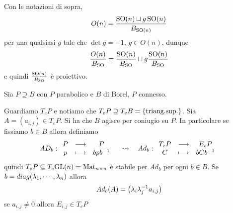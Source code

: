 \begin{remark}
Con le notazioni di sopra,
\[O(n)=\frac{\operatorname{SO}(n)\sqcup g\operatorname{SO}(n)}{B_{\operatorname{SO}(n)}}\]
per una qualsiasi $g$ tale che $\det g=-1$, $g\in O(n)$, dunque
\[\frac{O(n)}{B_{\operatorname{SO}}}=\frac{\operatorname{SO}(n)}{B_{\operatorname{SO}}}\sqcup g\frac{\operatorname{SO}(n)}{B_{\operatorname{SO}}}\]
e quindi $\frac{\operatorname{SO}(n)}{B_{\operatorname{SO}}}$ \`e proiettivo.
\end{remark}


\begin{example}[Parabolici di $\GL(n)$]
Sia $P\supseteq B$ con $P$ parabolico e $B$ di Borel, $P$ connesso.

Guardiamo $T_e P$ e notiamo che $T_e P\supseteq T_e B=\left\{{\text{triang.sup.}}\right\}$. Sia $A=(a_{i,j})\in T_e P$. Si ha che $B$ agisce per coniugio su $P$. In particolare se fissiamo $b\in B$ allora definiamo
\[AD_b:\begin{array}{ccc} {P} & \longrightarrow & {P}\\ {p} & \longmapsto & {bpb^{-1}} \end{array}\quad\leadsto\quad Ad_b:\begin{array}{ccc} {T_eP} & \longrightarrow & {E_eP}\\ {C} & \longmapsto & {bCb^{-1}} \end{array}\]
quindi $T_e P\subseteq T_e\mathrm{GL}(n)=\operatorname{Mat}_{n\times n}$ \`e stabile per $Ad_b$ per ogni $b\in B$. Se $b=diag(\lambda_1,\cdots,\lambda_n)$ allora
\[Ad_b(A)=\left({\lambda_i\lambda_j^{-1} a_{i,j}}\right)\]
se $a_{i,j}\neq 0$ allora $E_{i,j}\in T_eP$ 
\end{example}